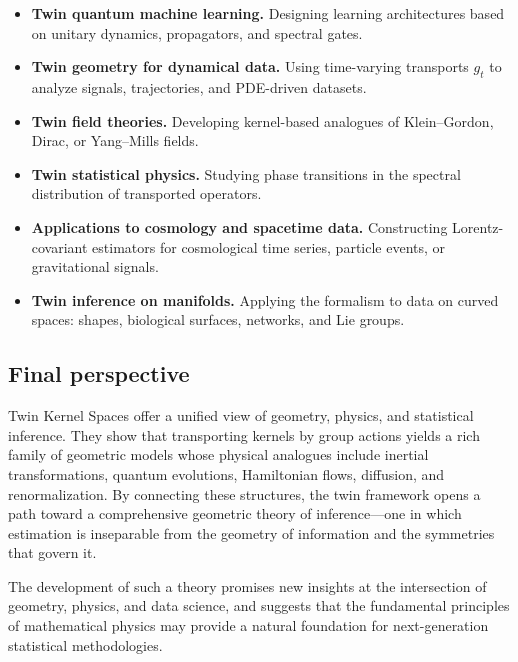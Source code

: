 \documentclass[11pt]{article}
\theoremstyle{definition}
\begin{document}
\begin{itemize}[itemsep=3pt]
	\item \textbf{Twin quantum machine learning.}  
	Designing learning architectures based on unitary dynamics, propagators, and spectral gates.
	
	\item \textbf{Twin geometry for dynamical data.}  
	Using time-varying transports $g_t$ to analyze signals, trajectories, and PDE-driven datasets.
	
	\item \textbf{Twin field theories.}  
	Developing kernel-based analogues of Klein–Gordon, Dirac, or Yang–Mills fields.
	
	\item \textbf{Twin statistical physics.}  
	Studying phase transitions in the spectral distribution of transported operators.
	
	\item \textbf{Applications to cosmology and spacetime data.}  
	Constructing Lorentz-covariant estimators for cosmological time series, particle events, or gravitational signals.
	
	\item \textbf{Twin inference on manifolds.}  
	Applying the formalism to data on curved spaces: shapes, biological surfaces, networks, and Lie groups.
\end{itemize}

\subsection*{Final perspective}

Twin Kernel Spaces offer a unified view of geometry, physics, and statistical inference.
They show that transporting kernels by group actions yields a rich family of geometric models whose physical analogues include inertial transformations, quantum evolutions, Hamiltonian flows, diffusion, and renormalization.
By connecting these structures, the twin framework opens a path toward a comprehensive geometric theory of inference—one in which estimation is inseparable from the geometry of information and the symmetries that govern it.

The development of such a theory promises new insights at the intersection of geometry, physics, and data science, and suggests that the fundamental principles of mathematical physics may provide a natural foundation for next-generation statistical methodologies.
\end{document}
